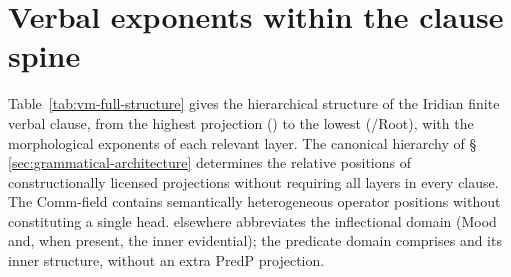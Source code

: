 \section{Verbal exponents within the clause spine}
\label{sec:vm-summary}

Table~\ref{tab:vm-full-structure} gives the hierarchical structure
of the Iridian finite verbal clause, from the highest projection
() to the lowest (/Root), with the morphological
exponents of each relevant layer. The canonical hierarchy of
§\,\ref{sec:grammatical-architecture} determines the relative positions of
constructionally licensed projections without requiring all layers in every
clause. The Comm-field contains semantically heterogeneous operator positions
without constituting a single head.  elsewhere abbreviates the
inflectional domain (Mood and, when present, the inner evidential); the
predicate domain comprises  and its inner structure, without
an extra PredP projection.

